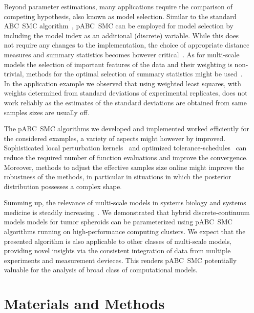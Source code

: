 \documentclass[10pt,letterpaper]{article}
\begin{document}
Beyond parameter estimations, many applications require the comparison of competing hypothesis, also known as model selection. Similar to the standard ABC~SMC algorithm~\cite{ToniStu2010}, pABC~SMC can be employed for model selection by including the model index as an additional (discrete) variable. While this does not require any changes to the implementation, the choice of appropriate distance measures and summary statistics becomes however critical~\cite{RobertCor2011}. As for multi-scale models the selection of important features of the data and their weighting is non-trivial, methods for the optimal selection of summary statistics might be used~\cite{NunesBal2010}. In the application example we observed that using weighted least squares, with weights determined from standard deviations of experimental replicates, does not work reliably as the estimates of the standard deviations are obtained from same samples sizes are usually off.

The pABC~SMC algorithms we developed and implemented worked efficiently for the considered examples, a variety of aspects might however by improved. Sophisticated local perturbation kernels~\cite{FilippiBar2013} and optimized tolerance-schedules~\cite{SilkFil2013} can reduce the required number of function evaluations and improve the convergence. Moreover, methods to adjust the effective samples size online might improve the robustness of the methods, in particular in situations in which the posterior distribution possesses a complex shape.

Summing up, the relevance of multi-scale models in systems biology and systems medicine is steadily increasing~\cite{HunterBor2003,MartinsFer2010,DadaMen2011,WalpolePap2013}. We demonstrated that hybrid discrete-continuum models models for tumor spheroids can be parameterized using pABC~SMC algorithms running on high-performance computing clusters. We expect that the presented algorithm is also applicable to other classes of multi-scale models, providing novel insights via the consistent integration of data from multiple experiments and measurement devieces. This renders pABC~SMC potentially valuable for the analysis of broad class of computational models.

\section*{Materials and Methods}
\end{document}
